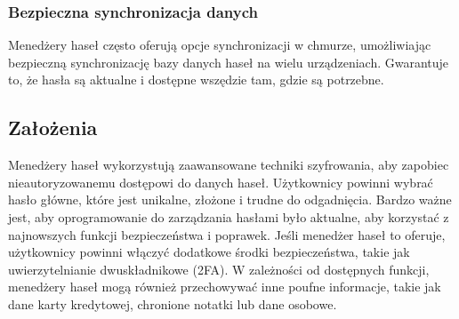 \subsubsection{Bezpieczna synchronizacja danych}
Menedżery haseł często oferują opcje synchronizacji w chmurze, umożliwiając bezpieczną synchronizację bazy danych haseł na wielu urządzeniach. Gwarantuje to, że hasła są aktualne i dostępne wszędzie tam, gdzie są potrzebne.

\subsection{Założenia}
Menedżery haseł wykorzystują zaawansowane techniki szyfrowania, aby zapobiec nieautoryzowanemu dostępowi do danych haseł.
Użytkownicy powinni wybrać hasło główne, które jest unikalne, złożone i trudne do odgadnięcia.
Bardzo ważne jest, aby oprogramowanie do zarządzania hasłami było aktualne, aby korzystać z najnowszych funkcji bezpieczeństwa i poprawek.
Jeśli menedżer haseł to oferuje, użytkownicy powinni włączyć dodatkowe środki bezpieczeństwa, takie jak uwierzytelnianie dwuskładnikowe (2FA).
W zależności od dostępnych funkcji, menedżery haseł mogą również przechowywać inne poufne informacje, takie jak dane karty kredytowej, chronione notatki lub dane osobowe.

